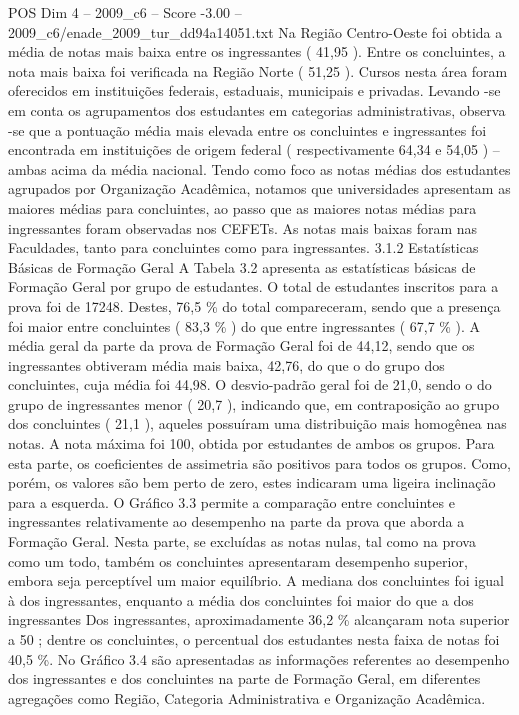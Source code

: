 \begin{textsample}{POS Dim 4 – 2009\_c6 – Score -3.00 – 2009\_c6/enade\_2009\_tur\_dd94a14051.txt}
Na Região Centro-Oeste foi obtida a média de notas mais baixa entre os ingressantes ( 41,95 ).
Entre os concluintes, a nota mais baixa foi verificada na Região Norte ( 51,25 ).
Cursos nesta área foram oferecidos em instituições federais, estaduais, municipais e privadas.
Levando -se em conta os agrupamentos dos estudantes em categorias administrativas, observa -se que a pontuação média mais elevada entre os concluintes e ingressantes foi encontrada em instituições de origem federal ( respectivamente 64,34 e 54,05 ) – ambas acima da média nacional.
Tendo como foco as notas médias dos estudantes agrupados por Organização Acadêmica, notamos que universidades apresentam as maiores médias para concluintes, ao passo que as maiores notas médias para ingressantes foram observadas nos CEFETs.
As notas mais baixas foram nas Faculdades, tanto para concluintes como para ingressantes. 3.1.2 Estatísticas Básicas de Formação Geral A Tabela 3.2 apresenta as estatísticas básicas de Formação Geral por grupo de estudantes.
O total de estudantes inscritos para a prova foi de 17248.
Destes, 76,5 \% do total compareceram, sendo que a presença foi maior entre concluintes ( 83,3 \% ) do que entre ingressantes ( 67,7 \% ).
A média geral da parte da prova de Formação Geral foi de 44,12, sendo que os ingressantes obtiveram média mais baixa, 42,76, do que o do grupo dos concluintes, cuja média foi 44,98.
O desvio-padrão geral foi de 21,0, sendo o do grupo de ingressantes menor ( 20,7 ), indicando que, em contraposição ao grupo dos concluintes ( 21,1 ), aqueles possuíram uma distribuição mais homogênea nas notas.
A nota máxima foi 100, obtida por estudantes de ambos os grupos.
Para esta parte, os coeficientes de assimetria são positivos para todos os grupos.
Como, porém, os valores são bem perto de zero, estes indicaram uma ligeira inclinação para a esquerda.
O Gráfico 3.3 permite a comparação entre concluintes e ingressantes relativamente ao desempenho na parte da prova que aborda a Formação Geral.
Nesta parte, se excluídas as notas nulas, tal como na prova como um todo, também os concluintes apresentaram desempenho superior, embora seja perceptível um maior equilíbrio.
A mediana dos concluintes foi igual à dos ingressantes, enquanto a média dos concluintes foi maior do que a dos ingressantes Dos ingressantes, aproximadamente 36,2 \% alcançaram nota superior a 50 ; dentre os concluintes, o percentual dos estudantes nesta faixa de notas foi 40,5 \%.
No Gráfico 3.4 são apresentadas as informações referentes ao desempenho dos ingressantes e dos concluintes na parte de Formação Geral, em diferentes agregações como Região, Categoria Administrativa e Organização Acadêmica.

\end{textsample}
